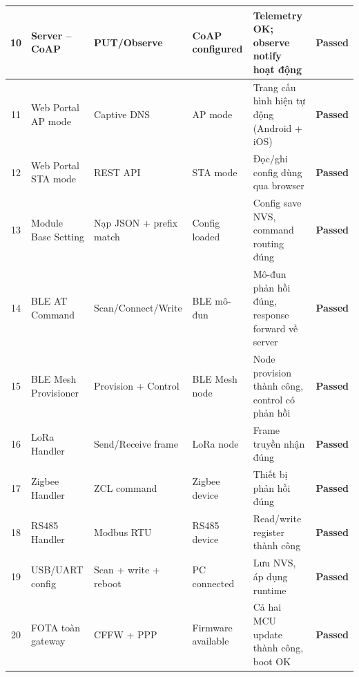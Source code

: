 \begin{longtable}{|c|p{}|p{}|p{}|p{}|c|}
            10 & Server -- CoAP & PUT/Observe & CoAP configured & Telemetry OK; observe notify hoạt động & \textcolor{modern_blue}{\textbf{Passed}} \\ \hline
            11 & Web Portal AP mode & Captive DNS & AP mode & Trang cấu hình hiện tự động (Android + iOS) & \textcolor{modern_blue}{\textbf{Passed}} \\ \hline
            12 & Web Portal STA mode & REST API & STA mode & Đọc/ghi config dùng qua browser & \textcolor{modern_blue}{\textbf{Passed}} \\ \hline
            13 & Module Base Setting & Nạp JSON + prefix match & Config loaded & Config save NVS, command routing đúng & \textcolor{modern_blue}{\textbf{Passed}} \\ \hline
            14 & BLE AT Command & Scan/Connect\newline/Write & BLE mô-đun & Mô-đun phản hồi đúng, response forward về server & \textcolor{modern_blue}{\textbf{Passed}} \\ \hline
            15 & BLE Mesh Provisioner & Provision + Control & BLE Mesh node & Node provision thành công, control có phản hồi & \textcolor{modern_blue}{\textbf{Passed}} \\ \hline
            16 & LoRa Handler & Send/Receive frame & LoRa node & Frame truyền nhận đúng & \textcolor{modern_blue}{\textbf{Passed}} \\ \hline
            17 & Zigbee Handler & ZCL command & Zigbee device & Thiết bị phản hồi đúng & \textcolor{modern_blue}{\textbf{Passed}} \\ \hline
            18 & RS485 Handler & Modbus RTU & RS485 device & Read/write register thành công & \textcolor{modern_blue}{\textbf{Passed}} \\ \hline
            19 & USB/UART config & Scan + write + reboot & PC connected & Lưu NVS, áp dụng runtime & \textcolor{modern_blue}{\textbf{Passed}} \\ \hline
            20 & FOTA toàn gateway & CFFW + PPP & Firmware available & Cả hai MCU update thành công, boot OK & \textcolor{modern_blue}{\textbf{Passed}} \\ \hline
        \end{longtable}
        
